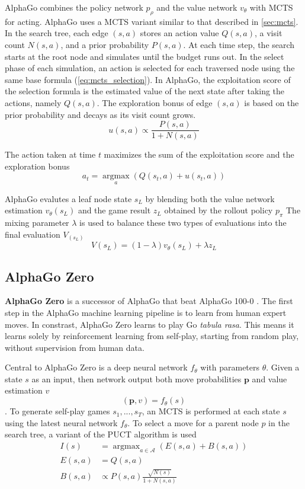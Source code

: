 AlphaGo combines the policy network $p_{\rho}$ and the value network $v_{\theta}$ with MCTS for acting.
AlphaGo uses a MCTS variant similar to that described in \ref{sec:mcts}.
In the search tree, each edge $(s, a)$ stores an action value $Q(s, a)$, a visit count $N(s, a)$, and a prior probability $P(s, a)$.
At each time step, the search starts at the root node and simulates until the budget runs out.
In the select phase of each simulation, an action is selected for each traversed node using the same base formula (\ref{eq:mcts_selection}).
In AlphaGo, the exploitation score of the selection formula is the estimated value of the next state after taking the actions, namely $Q(s, a)$.
The exploration bonus of edge $(s, a)$ is based on the prior probability and decays as its visit count grows.
\begin{equation}
    u(s, a) \propto \frac{P(s, a)}{1 + N(s, a)}
\end{equation}

The action taken at time $t$ maximizes the sum of the exploitation score and the exploration bonus
\begin{equation}
    a_{t}=\underset{a}{\operatorname{argmax}}\left(Q\left(s_{t}, a\right)+u\left(s_{t}, a\right)\right)
\end{equation}

AlphaGo evalutes a leaf node state $s_L$ by blending both the value network estimation $v_\theta(s_L)$ and the game result $z_L$ obtained by the rollout policy $p_\pi$
The mixing parameter $\lambda$ is used to balance these two types of evaluations into the final evaluation $V_(s_L)$
$$
    V\left(s_{L}\right)=(1-\lambda) v_{\theta}\left(s_{L}\right)+\lambda z_{L}
$$

\subsection{AlphaGo Zero}
\textbf{AlphaGo Zero} is a successor of AlphaGo that beat AlphaGo 100-0 \cite{MasteringGameGo_Silver.Schrittwieser.ea_2017}.
The first step in the AlphaGo machine learning pipeline is to learn from human expert moves.
In constrast, AlphaGo Zero learns to play Go \textit{tabula rasa}.
This means it learns solely by reinforcement learning from self-play, starting from random play, without supervision from human data.

Central to AlphaGo Zero is a deep neural network $f_\theta$ with parameters $\theta$.
Given a state $s$ as an input, then network output both move probabilities $\pmb{p}$ and value estimation $v$
$$(\pmb{p}, v) = f_\theta(s)$$.
To generate self-play games $s_1, ..., s_T$, an MCTS is performed at each state $s$ using the latest neural network $f_\theta$.
To select a move for a parent node $p$ in the search tree, a variant of the PUCT algorithm is used
\begin{align*}
    I(s)     & = \operatorname{argmax}_{a \in \mathcal{A}} \left( E(s, a) + B(s, a) \right)  \\
    E(s, a)  & = Q(s, a)  \\
    B(s, a)  & \propto P(s, a) \frac{\sqrt{N(s)}}{1+N(s, a)}
\end{align*}

